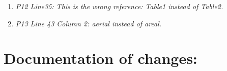 \documentclass{article}
\begin{document}
\begin{enumerate}
	\item \textit{P12 Line35: This is the wrong reference: Table1 instead of Table2.}

	
	\item \textit{P13 Line 43 Column 2: aerial instead of areal.}

	
\end{enumerate}
\newpage

\section*{Documentation of changes:}
\end{document}
